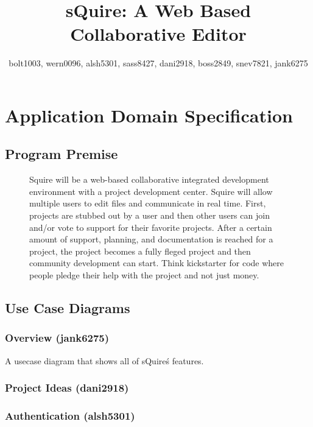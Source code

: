 \documentclass[11pt]{report}
\title{sQuire: A Web Based Collaborative Editor}
\author{bolt1003, wern0096, alsh5301, sass8427, dani2918, boss2849, snev7821, jank6275}
\begin{document}
\maketitle

\tableofcontents

\chapter{Application Domain Specification}

\section{Program Premise}
\begin{figure}[h!]
\caption{Squire will be a web-based collaborative integrated development environment with a project development center. Squire will allow multiple users to edit files and communicate in real time. First, projects are stubbed out by a user and then other users can join and/or vote to support for their favorite projects. After a certain amount of support, planning, and documentation is reached for a project, the project becomes a fully fleged project and then community development can start. Think kickstarter for code where people pledge their help with the project and not just money.}
\end{figure}



\section{Use Case Diagrams}
\subsection{Overview (jank6275)}
A usecase diagram that shows all of sQuire\'s features.

\subsection{Project Ideas (dani2918)}

\subsection{Authentication (alsh5301)}
\end{document}
